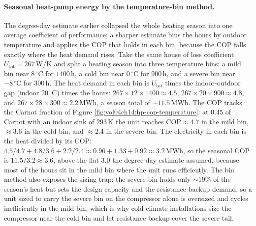 \paragraph{Seasonal heat-pump energy by the temperature-bin method.} The
degree-day estimate earlier collapsed the whole heating season into one
average coefficient of performance; a sharper estimate bins the hours by
outdoor temperature and applies the COP that holds in each bin, because the
COP falls exactly where the heat demand rises. Take the same house of loss
coefficient $U_{\text{tot}} = 267\,\si{\watt\per\kelvin}$ and split a heating
season into three temperature bins: a mild bin near $8\,{}^{\circ}\mathrm{C}$
for $1400\,\si{\hour}$, a cold bin near $0\,{}^{\circ}\mathrm{C}$ for
$900\,\si{\hour}$, and a severe bin near $-8\,{}^{\circ}\mathrm{C}$ for
$300\,\si{\hour}$. The heat demand in each bin is $U_{\text{tot}}$ times the
indoor-outdoor gap (indoor $20\,{}^{\circ}\mathrm{C}$) times the hours:
$267\times 12\times 1400 \approx 4.5$, $267\times 20\times 900 \approx 4.8$,
and $267\times 28\times 300 \approx 2.2\,\si{\mega\watt\hour}$, a season total
of $\sim 11.5\,\si{\mega\watt\hour}$. The COP tracks the Carnot fraction of
Figure \ref{fig:vol04ch14:hp-cop-temperature}: at $0.45$ of Carnot with an
indoor sink of $293\,\si{\kelvin}$ the unit reaches $\text{COP} \approx 4.7$
in the mild bin, $\approx 3.6$ in the cold bin, and $\approx 2.4$ in the
severe bin. The electricity in each bin is the heat divided by its COP:
$4.5/4.7 + 4.8/3.6 + 2.2/2.4 \approx 0.96 + 1.33 + 0.92 \approx 3.2\,\si{
\mega\watt\hour}$, so the seasonal COP is $11.5/3.2 \approx 3.6$, above the
flat $3.0$ the degree-day estimate assumed, because most of the hours sit in
the mild bin where the unit runs efficiently. The bin method also exposes the
sizing trap: the severe bin holds only $\sim 19\%$ of the season's heat but
sets the design capacity and the resistance-backup demand, so a unit sized to
carry the severe bin on the compressor alone is oversized and cycles
inefficiently in the mild bin, which is why cold-climate installations size
the compressor near the cold bin and let resistance backup cover the severe
tail.




